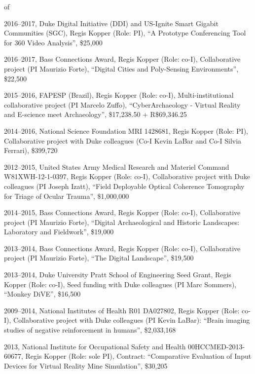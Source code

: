 \documentclass[wideaddress]{vitae}
\begin{document}
\begin{etaremune}
of 	\item{2016--2017, Duke Digital Initiative (DDI) and US-Ignite Smart Gigabit Communities (SGC), Regis Kopper (Role: PI), ``A Prototype Conferencing Tool for 360\textdegree{} Video Analysis'', \$25,000}
	\item{2016--2017, Bass Connections Award, Regis Kopper (Role: co-I), Collaborative project (PI Maurizio Forte), ``Digital Cities and Poly-Sensing Environments'', \$22,500}
	\item{2015--2016, FAPESP (Brazil), Regis Kopper (Role: co-I), Multi-institutional collaborative project (PI Marcelo Zuffo), ``CyberArchaeology - Virtual Reality and E-science meet Archaeology'', \$17,238.50 + R\$69,346.25}
	\item{2014--2016, National Science Foundation MRI 1428681, Regis Kopper (Role: PI), Collaborative project with Duke colleagues (Co-I Kevin LaBar and Co-I Silvia Ferrari), \$399,720}
	\item{2012--2015, United States Army Medical Research and Materiel Command W81XWH-12-1-0397, Regis Kopper (Role: co-I), Collaborative project with Duke colleagues (PI Joseph Izatt), ``Field Deployable Optical Coherence Tomography for Triage of Ocular Trauma'', \$1,000,000}
	\item{2014--2015, Bass Connections Award, Regis Kopper (Role: co-I), Collaborative project (PI Maurizio Forte), ``Digital Archaeological and Historic Landscapes: Laboratory and Fieldwork'', \$19,000}
	\item{2013--2014, Bass Connections Award, Regis Kopper (Role: co-I), Collaborative project (PI Maurizio Forte), ``The Digital Landscape'', \$19,500}
	\item{2013--2014, Duke University Pratt School of Engineering Seed Grant, Regis Kopper (Role: co-I), Seed funding with Duke colleagues (PI Marc Sommers), ``Monkey DiVE'', \$16,500}
	\item{2009--2014, National Institutes of Health R01 DA027802, Regis Kopper (Role: co-I), Collaborative project with Duke colleagues (PI Kevin LaBar): ``Brain imaging studies of negative reinforcement in humans'', \$2,033,168}
	\item{2013, National Institute for Occupational Safety and Health 00HCCMED-2013-60677, Regis Kopper (Role: sole PI), Contract: ``Comparative Evaluation of Input Devices for Virtual Reality Mine Simulation'', \$30,205}
\end{etaremune}


\end{document}
